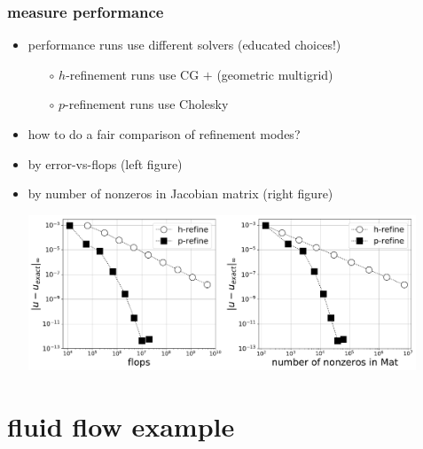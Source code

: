 \documentclass[hide notes,intlimits,usenames,dvipsnames]{beamer}
\begin{document}
\begin{frame}[fragile]
\frametitle{measure performance}
\begin{itemize}
\item performance runs use different solvers (educated choices!)
    \begin{itemize}
    \item[$\circ$] $h$-refinement runs use CG $+$ (geometric multigrid)
    \item[$\circ$] $p$-refinement runs use Cholesky
    \end{itemize}
\item how to do a fair comparison of refinement modes?
\item by error-vs-flops (left figure)
\item by number of nonzeros in Jacobian matrix (right figure)

\medskip
\mbox{\includegraphics[width=0.46\textwidth]{hprefine-Linf-flops}\quad\includegraphics[width=0.45\textwidth]{hprefine-Linf-nnz}}
\end{itemize}
\end{frame}


\section{fluid flow example}
\end{document}
